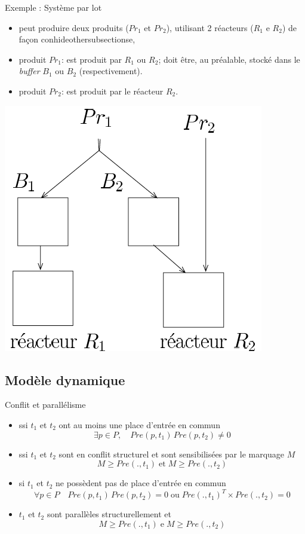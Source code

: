 \documentclass[compress]{beamer}
\begin{document}
\begin{frame}{Exemple : Système par lot}
\begin{itemize}
\item peut produire deux produits ($Pr_1$ et $Pr_2$), utilisant 2 réacteurs
($R_1$ e $R_2$) de fa\c{c}on conhideothersubsectionse,
\item produit $Pr_1$: est produit par $R_1$ ou $R_2$; doit être, au préalable,
stocké dans le {\it buffer} $B_1$ ou $B_2$ (respectivement).
\item produit $Pr_2$: est produit par le réacteur $R_2$.
\end{itemize}
\begin{center}
\includegraphics[width=.4\linewidth]{reacteur}
\end{center}
\end{frame}
 
\subsection{Modèle dynamique}
\begin{frame}{Conflit et parallélisme}
\begin{itemize}
\item {} ssi  $t_1$ et $t_2$ ont au moins une place d'entrée en commun
	$$\exists p \in P, \quad Pre(p,t_1) \, Pre(p,t_2) \neq 0$$
\item {} ssi $t_1$ et $t_2$ sont en conflit structurel et sont sensibilisées par le marquage $M$
	$$M \geq Pre(.,t_1) \; \mbox{et} \; M \geq  Pre(.,t_2)$$
\item {} si $t_1$ et $t_2$ ne possèdent pas de place d'entrée en commun
	$$\forall p \in P \quad Pre(p,t_1) \, Pre(p,t_2) = 0  \;
	\mbox{ou} \; Pre(.,t_1)^T \times Pre(.,t_2) = 0$$
\item {} $t_1$ et $t_2$ sont parallèles structurellement et
$$M \geq Pre(.,t_1) \; \mbox{e} \; M \geq Pre(.,t_2)$$
\end{itemize}
\end{frame}
\end{document}
